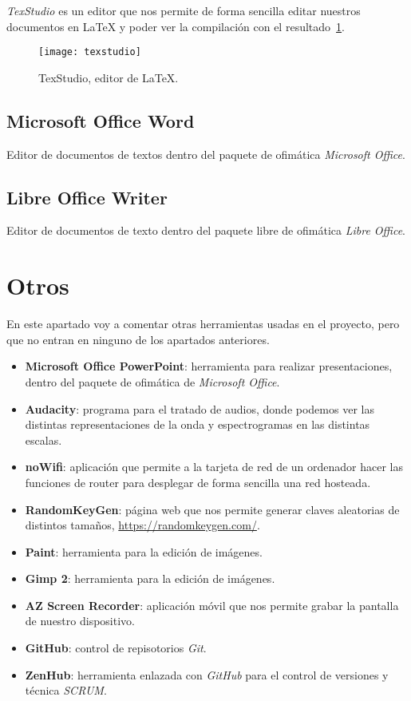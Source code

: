 \textit{TexStudio} es un editor que nos permite de forma sencilla editar nuestros documentos en \LaTeX{} y poder ver la compilación con el resultado~\ref{fig:texstudio}.

\begin{figure}
	\centering
	\texttt{[image: texstudio]}
	\caption{TexStudio, editor de \LaTeX.}
	\label{fig:texstudio}
\end{figure}

\subsection{Microsoft Office Word}
Editor de documentos de textos dentro del paquete de ofimática \textit{Microsoft Office}.
\subsection{Libre Office Writer}
Editor de documentos de texto dentro del paquete libre de ofimática \textit{Libre Office}.

\section{Otros}
En este apartado voy a comentar otras herramientas usadas en el proyecto, pero que no entran en ninguno de los apartados anteriores.
\begin{itemize}
	\item \textbf{Microsoft Office PowerPoint}: herramienta para realizar presentaciones, dentro del paquete de ofimática de \textit{Microsoft Office}.
	\item \textbf{Audacity}: programa para el tratado de audios, donde podemos ver las distintas representaciones de la onda y espectrogramas en las distintas escalas.
	\item \textbf{noWifi}: aplicación que permite a la tarjeta de red de un ordenador hacer las funciones de router para desplegar de forma sencilla una red hosteada.
	\item \textbf{RandomKeyGen}: página web que nos permite generar claves aleatorias de distintos tamaños, \url{https://randomkeygen.com/}.
	\item \textbf{Paint}: herramienta para la edición de imágenes.
	\item \textbf{Gimp 2}: herramienta para la edición de imágenes.
	\item \textbf{AZ Screen Recorder}: aplicación móvil que nos permite grabar la pantalla de nuestro dispositivo.
	\item \textbf{GitHub}: control de repisotorios \textit{Git}.
	\item \textbf{ZenHub}: herramienta enlazada con \textit{GitHub} para el control de versiones y técnica \textit{SCRUM}.
\end{itemize}